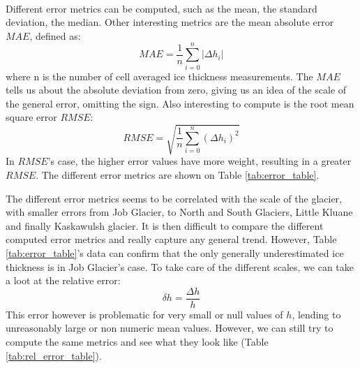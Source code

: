 \documentclass[a4, 12pt]{article}
\begin{document}
\\
Different error metrics can be computed, such as the mean, the standard deviation, the median. Other interesting metrics are the mean absolute error $MAE$, defined as: 
\begin{equation}
MAE = \frac{1}{n}\sum_{i=0}^{n}|\Delta h_i|
\end{equation}
where n is the number of cell averaged ice thickness measurements. The $MAE$ tells us about the absolute deviation from zero, giving us an idea of the scale of the general error, omitting the sign. Also interesting to compute is the root mean square error $RMSE$:
\begin{equation}
RMSE = \sqrt{\frac{1}{n}\sum_{i=0}^{n}(\Delta h_i)^2}
\end{equation}
In $RMSE$'s case, the higher error values have more weight, resulting in a greater $RMSE$. The different error metrics are shown on Table \ref{tab:error_table}. 

\begin{table}[h!]
\centering
\small
\caption{Error from the ice thickness models computed by \citet{farinotti2019consensus} for the glacier test cases against cell averaged GPR measurements. Note that every metric is shown in metres.}
\label{tab:error_table}
\noindent{}
\end{table}
\FloatBarrier
The different error metrics seems to be correlated with the scale of the glacier, with smaller errors from Job Glacier, to North and South Glaciers, Little Kluane and finally Kaskawulsh glacier. It is then difficult to compare the different computed error metrics and really capture any general trend. However, Table \ref{tab:error_table}'s data can confirm that the only generally underestimated ice thickness is in Job Glacier's case. To take care of the different scales, we can take a loot at the relative error:
\begin{equation}
\delta h = \frac{\Delta h}{h}
\end{equation}
This error however is problematic for very small or null values of $h$, lending to unreasonably large or non numeric mean values. However, we can still try to compute the same metrics and see what they look like (Table \ref{tab:rel_error_table}).
\end{document}
